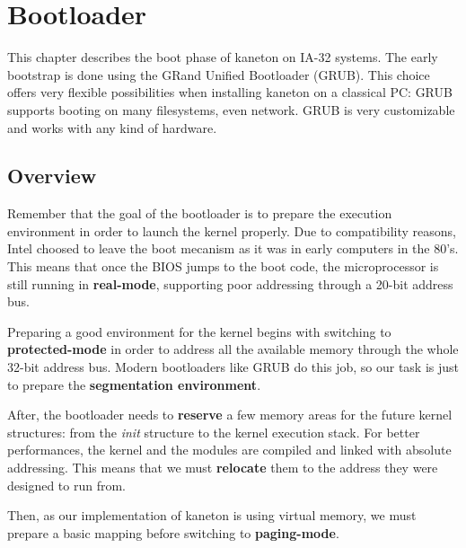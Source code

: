 %
%
%
%
%
%

%
%

\chapter{Bootloader}

This chapter describes the boot phase of kaneton on IA-32 systems. The
early bootstrap is done using the GRand Unified Bootloader
(GRUB). This choice offers very flexible possibilities when installing
kaneton on a classical PC: GRUB supports booting on many filesystems,
even network. GRUB is very customizable and works with any kind of
hardware.

\newpage

%
%

\section{Overview}

Remember that the goal of the bootloader is to prepare the execution
environment in order to launch the kernel properly. Due to
compatibility reasons, Intel choosed to leave the boot mecanism as it
was in early computers in the 80's. This means that once the BIOS
jumps to the boot code, the microprocessor is still running in
\textbf{real-mode}, supporting poor addressing through a 20-bit
address bus.

Preparing a good environment for the kernel begins with switching to
\textbf{protected-mode} in order to address all the available memory
through the whole 32-bit address bus. Modern bootloaders like GRUB do
this job, so our task is just to prepare the \textbf{segmentation
environment}.

After, the bootloader needs to \textbf{reserve} a few memory areas for
the future kernel structures: from the \textit{init} structure to the
kernel execution stack. For better performances, the kernel and the
modules are compiled and linked with absolute addressing. This means
that we must \textbf{relocate} them to the address they were designed
to run from.

Then, as our implementation of kaneton is using virtual memory, we
must prepare a basic mapping before switching to \textbf{paging-mode}.

